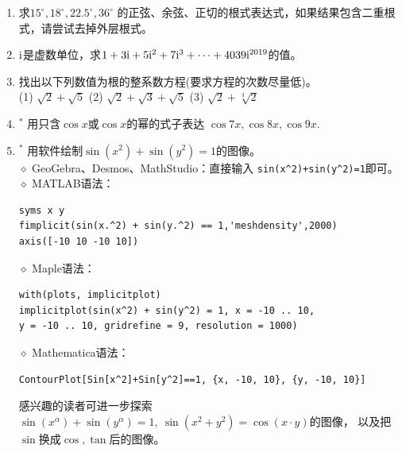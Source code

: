 \begin{enumerate}[label={\textbf{\arabic*.}},leftmargin=
    \inteval{\myenumleftmargin}pt]
\item 求$ 15^{\circ},18^{\circ},22.5^{\circ},36^{\circ} $
的正弦、余弦、正切的根式表达式，如果结果包含二重根式，请尝试去掉外层根式。

\item $ \mathrm{i} $是虚数单位，求$ 1+3\mathrm{i}+5\mathrm{i}^2+7\mathrm{i}^3+\cdots +4039\mathrm{i}^{2019} $的值。

\item 找出以下列数值为根的整系数方程(要求方程的次数尽量低)。\\
(1) $ \sqrt{2}+\sqrt{5} $ \quad 
(2) $ \sqrt{2}+\sqrt{3}+\sqrt{5} $ \quad 
(3) $ \sqrt{2}+\sqrt[3]{2} $ 

\item$^*$  用只含$ \cos x $或$ \cos x $的幂的式子表达
$ \cos 7x,\cos 8x,\cos 9x $. 

\item$ ^* $ 用软件绘制$ \sin(x^2)+\sin(y^2)=1 $的图像。\\
$\diamond$ GeoGebra、Desmos、MathStudio：直接输入
\verb|sin(x^2)+sin(y^2)=1|即可。\\
$\diamond$ MATLAB语法：
\begin{lstlisting}
syms x y
fimplicit(sin(x.^2) + sin(y.^2) == 1,'meshdensity',2000)
axis([-10 10 -10 10])    
\end{lstlisting} 
$\diamond$ Maple语法：
\begin{lstlisting}
with(plots, implicitplot)
implicitplot(sin(x^2) + sin(y^2) = 1, x = -10 .. 10, 
y = -10 .. 10, gridrefine = 9, resolution = 1000)    
\end{lstlisting} 
$\diamond$ Mathematica语法：
\begin{lstlisting}
ContourPlot[Sin[x^2]+Sin[y^2]==1, {x, -10, 10}, {y, -10, 10}]    
\end{lstlisting} 

感兴趣的读者可进一步探索$ \sin(x^{\alpha})+\sin(y^{\alpha})=1,\ 
\sin\left(x^{2}+y^{2}\right)=\cos\left(x\cdot y\right) $的图像，
以及把$ \sin $换成$ \cos,\tan $后的图像。

\end{enumerate}

